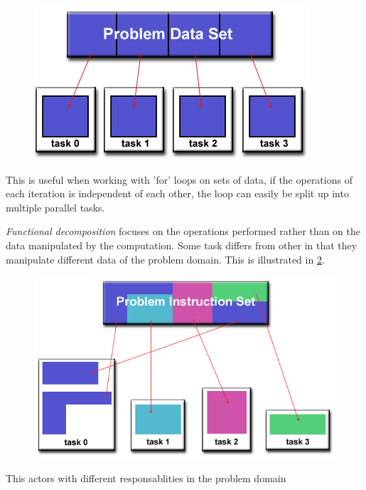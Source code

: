   \begin{figure}[htbp]
    \label{dom}  \includegraphics[width=\textwidth]{Analysis/Supercomputing/domain_decomp.png}
    \caption{}
  \end{figure}

  This is useful when working with 'for' loops on sets of data, if the operations of each iteration is independent of each other, the loop can easily be split up into multiple parallel tasks.

  \emph{Functional decomposition} focuses on the operations performed rather than on the data manipulated by the computation. Some task differs from other in that they manipulate different data of the problem domain. This is illustrated in \cref{fun}.

  \begin{figure}[htbp]
    \label{fun}  \includegraphics[width=\textwidth]{Analysis/Supercomputing/functional_decomp.png}
    \caption{}
  \end{figure}

  This actors with different responsablities in the problem domain
